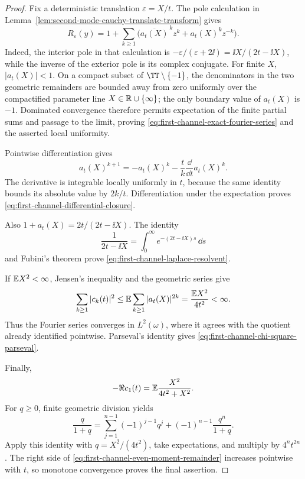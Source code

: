 \begin{proof}
Fix a deterministic translation \(\varepsilon=X/t\).
The pole calculation in
Lemma~\ref{lem:second-mode-cauchy-translate-transform} gives
\[
 R_\varepsilon(y)
 =1+\sum_{k\ge1}\bigl(\overline{a_t(X)}^{\,k}z^k
 +a_t(X)^kz^{-k}\bigr).
\]
Indeed, the interior pole in that calculation is
\(-\varepsilon/(\varepsilon+2\ii)=\ii X/(2t-\ii X)\), while the inverse of
the exterior pole is its complex conjugate.  For finite \(X\),
\(|a_t(X)|<1\).  On a compact subset of
\(\TT\setminus\{-1\}\), the denominators in the two geometric remainders
are bounded away from zero uniformly over the compactified parameter line
\(X\in\mathbb{R}\cup\{\infty\}\); the only boundary value of \(a_t(X)\) is
\(-1\).  Dominated convergence therefore permits expectation of the finite
partial sums and passage to the limit, proving
\eqref{eq:first-channel-exact-fourier-series} and the asserted local
uniformity.

Pointwise differentiation gives
\[
 a_t(X)^{k+1}=-a_t(X)^k-\frac{t}{k}
 \frac{\dd}{\dd t}a_t(X)^k.
\]
The derivative is integrable locally uniformly in \(t\), because the same
identity bounds its absolute value by \(2k/t\).  Differentiation under the
expectation proves \eqref{eq:first-channel-differential-closure}.

Also \(1+a_t(X)=2t/(2t-\ii X)\).  The identity
\[
 \frac1{2t-\ii X}=\int_0^\infty e^{-(2t-\ii X)s}\,\dd s
\]
and Fubini's theorem prove \eqref{eq:first-channel-laplace-resolvent}.

If \(\mathbb{E} X^2<\infty\), Jensen's inequality and the geometric series give
\[
 \sum_{k\ge1}|c_k(t)|^2
 \le\mathbb{E}\sum_{k\ge1}|a_t(X)|^{2k}
 =\frac{\mathbb{E} X^2}{4t^2}<\infty.
\]
Thus the Fourier series converges in \(L^2(\omega)\), where it agrees with
the quotient already identified pointwise.  Parseval's identity gives
\eqref{eq:first-channel-chi-square-parseval}.

Finally,
\begin{equation}\label{eq:first-channel-real-part}
 -\Re c_1(t)=\mathbb{E}\frac{X^2}{4t^2+X^2}.
\end{equation}
For \(q\ge0\), finite geometric division yields
\[
 \frac q{1+q}=\sum_{j=1}^{n-1}(-1)^{j-1}q^j
 +(-1)^{n-1}\frac{q^n}{1+q}.
\]
Apply this identity with \(q=X^2/(4t^2)\), take expectations, and multiply
by \(4^nt^{2n}\).  The right side of
\eqref{eq:first-channel-even-moment-remainder} increases pointwise with
\(t\), so monotone convergence proves the final assertion.
\end{proof}


